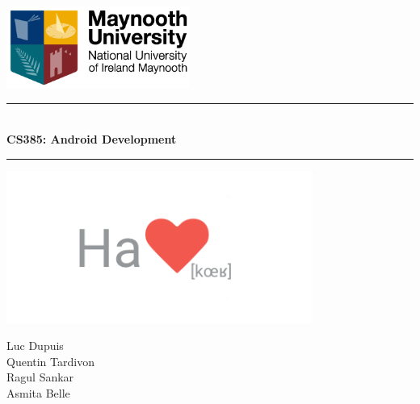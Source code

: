 \thispagestyle{empty}

{\color{primary}

\hspace{4.5cm}
\includegraphics[width=6.0cm]{img/maynooth.png}



\vspace{0.5cm}

	\begin{center}


			{\color[rgb]{0.8,0.8,.8}\rule{\textwidth}{0.8pt}}
			\vspace{0.5cm}

			\baselineskip=3pt
			{\Huge \bfseries{\appName}}\\
			\vspace{0.2cm}
			{\huge \bfseries{CS385: Android Development}}
			\vspace{0.5cm}

		{\color[rgb]{0.8,0.8,.8}\rule{\textwidth}{0.8pt}}
		\vspace{0.5cm}


		\includegraphics[width=10cm]{logo.png}

		\vspace{4cm}
		\Large{Luc Dupuis}\\
		\Large{Quentin Tardivon}\\
		\Large{Ragul Sankar}\\
		\Large{Asmita Belle}

		\vspace{0.5cm}
		\large{\schoolYear}
	\end{center}

}
